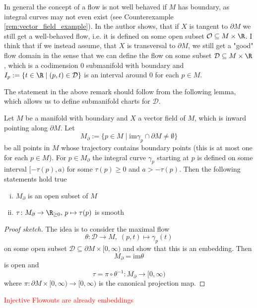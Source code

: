 \begin{remark}
    In general the concept of a flow is not well behaved if $M$ has boundary, as integral curves may not even exist (see Counterexample \ref{rem:vector_field_example}). In \cite{lee2011smooth} the author shows, that if $X$ is tangent to $\partial M$ we still get a well-behaved flow, i.e. it is defined on some open subset $\mathcal{O} \subseteq M \times \R$. I think that if we instead assume, that $X$ is transversal to $\partial M$, we still get a "good" flow domain in the sense that we can define the flow on some subset $\mathcal{D} \subseteq M \times \R$, which is a codimension $0$ submanifold with boundary and $I_p := \{ t \in \R \mid (p,t) \in \mathcal{D}\}$ is an interval around $0$ for each $p \in M$.
\end{remark}

The statement in the above remark should follow from the following lemma, which allows us to define submanifold charts for $\mathcal{D}$.

\begin{lemma}
    Let $M$ be a manifold with boundary and $X$ a vector field of $M$, which is inward pointing along $\partial M$. Let 
    \[
    M_{\partial} := \{p \in M \mid \mathrm{im}\gamma_p \cap \partial M \neq \emptyset\}
    \]
    be all points in $M$ whose trajectory contains boundary points (this is at most one for each $p \in M$). For $p \in M_\partial$ the integral curve $\gamma_p$ starting at $p$ is defined on some interval $[-\tau(p),a)$ for some $\tau(p) \geq 0$ and $a > -\tau(p)$. Then the following statements hold true
    \begin{enumerate}[(i)]
        \item $M_\partial$ is an open subset of $M$
        \item $\tau \colon M_\partial \to \R_{\geq 0}, \, p \mapsto \tau(p)$ is smooth
    \end{enumerate}
\end{lemma}
\begin{proof}[Proof sketch]
    The idea is to consider the maximal flow
    \[
    \theta \colon \mathcal{D} \to M, \; (p,t) \mapsto \gamma_p(t)
    \]
    on some open subset $\mathcal{D} \subseteq \partial M \times [0,\infty)$ and show that this is an embedding. Then 
    \[
    M_\partial = \mathrm{im} \theta
    \]
    is open and 
    \[
    \tau = \pi \circ \theta^{-1} \colon M_\partial \to [0,\infty)
    \]
    where $\pi \colon \partial M \times [0,\infty) \to [0,\infty)$ is the canonical projection map.
\end{proof}


\begin{lemma}
    \LARGE \textcolor{red}{Injective Flowouts are already embeddings}
\end{lemma}